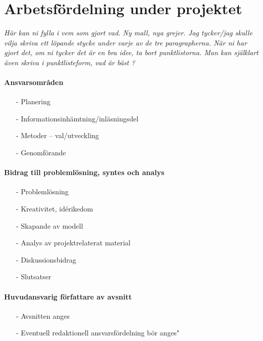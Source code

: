 \documentclass[12pt,a4paper]{article}
\begin{document}

\section*{Arbetsfördelning under projektet}

\emph{\color{red}Här kan ni fylla i vem som gjort vad.}
\emph{\color{red}Ny mall, nya grejer. Jag tycker/jag skulle vilja skriva ett löpande stycke under varje av de tre paragrapherna. När ni har gjort det, om ni tycker det är en bra idee, ta bort punktlistorna. Man kan själklart även skriva i punktlisteform, vad är bäst ?}

\paragraph{Ansvarsområden}
\begin{itemize}
\item[-] Planering
\item[-] Informationsinhämtning/inläsningsdel
\item[-] Metoder -- val/utveckling 
\item[-] Genomförande 
\end{itemize}

\paragraph{Bidrag till problemlösning, syntes och analys}

\begin{itemize}
\item[-] Problemlösning 
\item[-] Kreativitet, idérikedom
\item[-] Skapande av modell
\item[-] Analys av projektrelaterat material 
\item[-] Diskussionsbidrag
\item[-] Slutsatser 
\end{itemize}

\paragraph{Huvudansvarig författare av avsnitt}

\begin{itemize}
\item[-] Avsnitten anges
\item[-] Eventuell redaktionell ansvarsfördelning bör anges"
\end{itemize}
\end{document}
